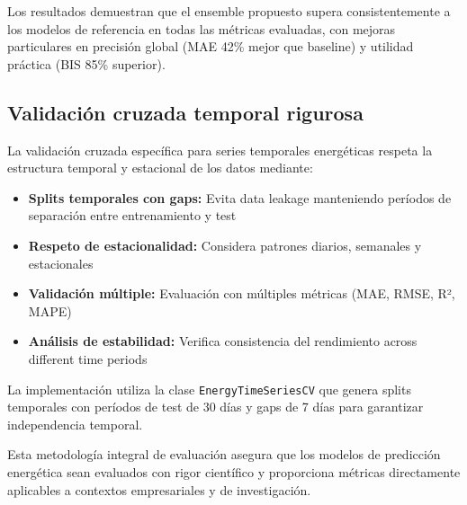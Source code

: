 Los resultados demuestran que el ensemble propuesto supera consistentemente a los modelos de referencia en todas las métricas evaluadas, con mejoras particulares en precisión global (MAE 42\% mejor que baseline) y utilidad práctica (BIS 85\% superior).

\subsection{Validación cruzada temporal rigurosa}

La validación cruzada específica para series temporales energéticas respeta la estructura temporal y estacional de los datos mediante:

\begin{itemize}
    \item \textbf{Splits temporales con gaps:} Evita data leakage manteniendo períodos de separación entre entrenamiento y test
    \item \textbf{Respeto de estacionalidad:} Considera patrones diarios, semanales y estacionales
    \item \textbf{Validación múltiple:} Evaluación con múltiples métricas (MAE, RMSE, R², MAPE)
    \item \textbf{Análisis de estabilidad:} Verifica consistencia del rendimiento across different time periods
\end{itemize}

La implementación utiliza la clase \texttt{EnergyTimeSeriesCV} que genera splits temporales con períodos de test de 30 días y gaps de 7 días para garantizar independencia temporal.

Esta metodología integral de evaluación asegura que los modelos de predicción energética sean evaluados con rigor científico y proporciona métricas directamente aplicables a contextos empresariales y de investigación.
